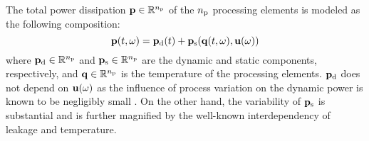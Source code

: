 The total power dissipation $\mathbf{p} \in \mathbb{R}^{n_\text{p}}$ of the ${n_\text{p}}$ processing elements is modeled as the following composition:
\begin{equation} \elabel{power-model}
  \vP(\t, \o) = \vP_\dynamic(\t) + \vP_\static(\vQ(\t, \o), \vU(\o))
\end{equation}
where $\mathbf{p}_{\text{d}} \in \mathbb{R}^{n_\text{p}}$ and $\mathbf{p}_{\text{s}} \in \mathbb{R}^{n_\text{p}}$ are the dynamic and static components, respectively, and $\mathbf{q} \in \mathbb{R}^{n_\text{p}}$ is the temperature of the processing elements.
$\mathbf{p}_{\text{d}}$ does not depend on $\mathbf{u}(\omega)$ as the influence of process variation on the dynamic power is known to be negligibly small \cite{srivastava2010}.
On the other hand, the variability of $\mathbf{p}_{\text{s}}$ is substantial and is further magnified by the well-known interdependency of leakage and temperature.

